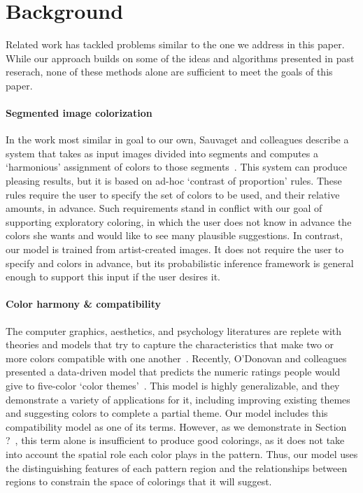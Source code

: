 \section{Background}
\label{sec:background}

Related work has tackled problems similar to the one we address in this paper. While our approach builds on some of the ideas and algorithms presented in past reserach, none of these methods alone are sufficient to meet the goals of this paper.

\paragraph{Segmented image colorization}
In the work most similar in goal to our own, Sauvaget and colleagues describe a system that takes as input images divided into segments and computes a `harmonious' assignment of colors to those segments~. This system can produce pleasing results, but it is based on ad-hoc `contrast of proportion' rules. These rules require the user to specify the set of colors to be used, and their relative amounts, in advance. Such requirements stand in conflict with our goal of supporting exploratory coloring, in which the user does not know in advance the colors she wants and would like to see many plausible suggestions. In contrast, our model is trained from artist-created images. It does not require the user to specify and colors in advance, but its probabilistic inference framework is general enough to support this input if the user desires it.

\paragraph{Color harmony \& compatibility}
The computer graphics, aesthetics, and psychology literatures are replete with theories and models that try to capture the characteristics that make two or more colors compatible with one another~\cite{CohenOrHarmonization,Munsell,PalmerColorPreference}. Recently, O'Donovan and colleagues presented a data-driven model that predicts the numeric ratings people would give to five-color `color themes'~. This model is highly generalizable, and they demonstrate a variety of applications for it, including improving existing themes and suggesting colors to complete a partial theme. Our model includes this compatibility model as one of its terms. However, as we demonstrate in Section ?~, this term alone is insufficient to produce good colorings, as it does not take into account the spatial role each color plays in the pattern. Thus, our model uses the distinguishing features of each pattern region and the relationships between regions to constrain the space of colorings that it will suggest.

